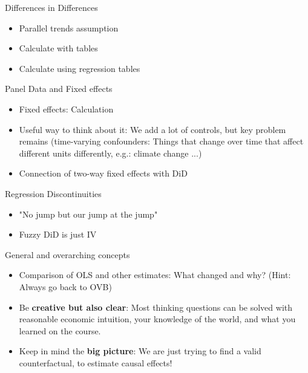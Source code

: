 \documentclass[11pt,xcolor=table]{beamer}
\begin{document}
  \begin{frame}{Differences in Differences}
     \begin{itemize}
         \item Parallel trends assumption
        \item Calculate with tables
        \item Calculate using regression tables 
     \end{itemize}
 \end{frame}


  \begin{frame}{Panel Data and Fixed effects}
     \begin{itemize}
         \item Fixed effects: Calculation
         \item Useful way to think about it: We add a lot of controls, but key problem remains (time-varying confounders: Things that change over time that affect different units differently, e.g.: climate change ...)
         \item Connection of two-way fixed effects with DiD
     \end{itemize}
 \end{frame}


  \begin{frame}{Regression Discontinuities}
     \begin{itemize}
         \item "No jump but our jump at the jump"
         \item Fuzzy DiD is just IV
     \end{itemize}
 \end{frame}



  \begin{frame}{General and overarching concepts}
     \begin{itemize}
         \item Comparison of OLS and other estimates: What changed and why? (Hint: Always go back to OVB)%
         \item Be \textbf{\alert{creative but also clear}}: Most thinking questions can be solved with reasonable economic intuition, your knowledge of the world, and what you learned on the course.
        \item Keep in mind the \textbf{\alert{big picture}}: We are just trying to find a valid counterfactual, to estimate causal effects! 
     \end{itemize}
 \end{frame}
\end{document}
